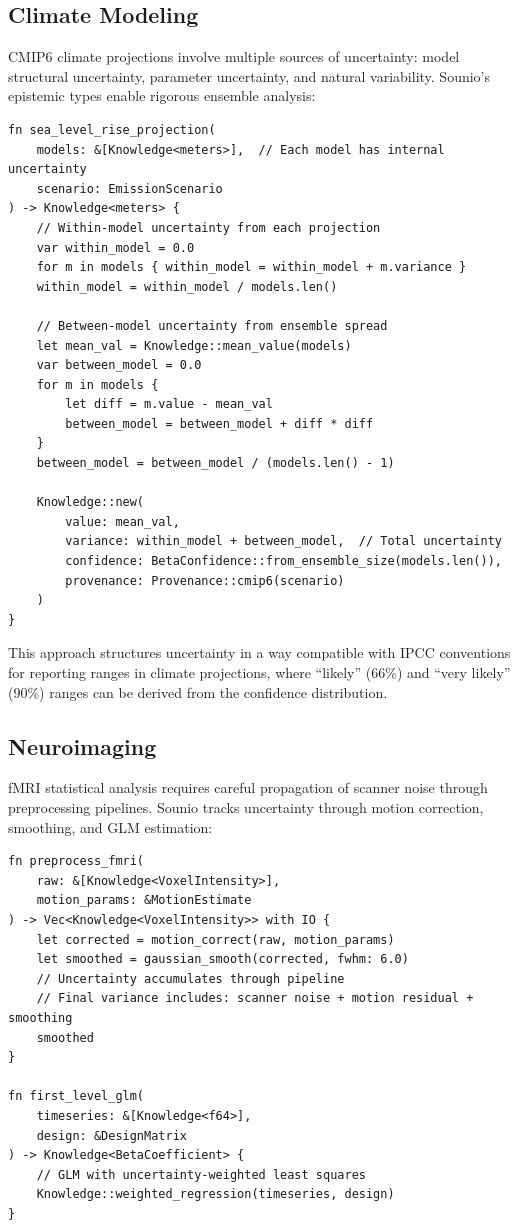 \documentclass[11pt,a4paper]{article}
\begin{document}
\subsection{Climate Modeling}

CMIP6 climate projections involve multiple sources of uncertainty: model
structural uncertainty, parameter uncertainty, and natural variability.
Sounio's epistemic types enable rigorous ensemble analysis:

\begin{lstlisting}[caption={Climate ensemble analysis with structured uncertainty}]
fn sea_level_rise_projection(
    models: &[Knowledge<meters>],  // Each model has internal uncertainty
    scenario: EmissionScenario
) -> Knowledge<meters> {
    // Within-model uncertainty from each projection
    var within_model = 0.0
    for m in models { within_model = within_model + m.variance }
    within_model = within_model / models.len()

    // Between-model uncertainty from ensemble spread
    let mean_val = Knowledge::mean_value(models)
    var between_model = 0.0
    for m in models {
        let diff = m.value - mean_val
        between_model = between_model + diff * diff
    }
    between_model = between_model / (models.len() - 1)

    Knowledge::new(
        value: mean_val,
        variance: within_model + between_model,  // Total uncertainty
        confidence: BetaConfidence::from_ensemble_size(models.len()),
        provenance: Provenance::cmip6(scenario)
    )
}
\end{lstlisting}

This approach structures uncertainty in a way compatible with IPCC
conventions for reporting ranges in climate projections, where
``likely'' (66\%) and ``very likely'' (90\%) ranges can be derived
from the confidence distribution.

\subsection{Neuroimaging}

fMRI statistical analysis requires careful propagation of scanner noise
through preprocessing pipelines. Sounio tracks uncertainty through motion
correction, smoothing, and GLM estimation:

\begin{lstlisting}[caption={fMRI preprocessing with uncertainty}]
fn preprocess_fmri(
    raw: &[Knowledge<VoxelIntensity>],
    motion_params: &MotionEstimate
) -> Vec<Knowledge<VoxelIntensity>> with IO {
    let corrected = motion_correct(raw, motion_params)
    let smoothed = gaussian_smooth(corrected, fwhm: 6.0)
    // Uncertainty accumulates through pipeline
    // Final variance includes: scanner noise + motion residual + smoothing
    smoothed
}

fn first_level_glm(
    timeseries: &[Knowledge<f64>],
    design: &DesignMatrix
) -> Knowledge<BetaCoefficient> {
    // GLM with uncertainty-weighted least squares
    Knowledge::weighted_regression(timeseries, design)
}
\end{lstlisting}
\end{document}
